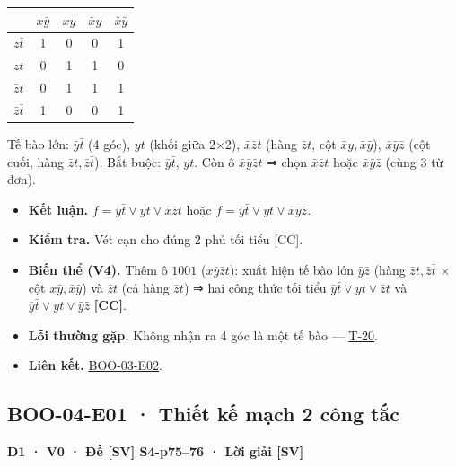 \documentclass[
  10pt,
  twoside,openany]{book}
\providecommand{\tightlist}{%
  \setlength{\itemsep}{0pt}\setlength{\parskip}{0pt}}
\begin{document}
\begin{longtable}[]{@{}lcccc@{}}
\toprule\noalign{}
& \(x\bar y\) & \(xy\) & \(\bar xy\) & \(\bar x\bar y\) \\
\midrule\noalign{}
\endhead
\bottomrule\noalign{}
\endlastfoot
\(z\bar t\) & 1 & 0 & 0 & 1 \\
\(zt\) & 0 & 1 & 1 & 0 \\
\(\bar zt\) & 0 & 1 & 1 & 1 \\
\(\bar z\bar t\) & 1 & 0 & 0 & 1 \\
\end{longtable}

Tế bào lớn: \(\bar y\bar t\) (4 góc), \(yt\) (khối giữa 2×2),
\(\bar x\bar zt\) (hàng \(\bar zt\), cột \(\bar xy,\bar x\bar y\)),
\(\bar x\bar y\bar z\) (cột cuối, hàng \(\bar zt,\bar z\bar t\)). Bắt
buộc: \(\bar y\bar t\), \(yt\). Còn ô \(\bar x\bar y\bar zt\) ⇒ chọn
\(\bar x\bar zt\) hoặc \(\bar x\bar y\bar z\) (cùng 3 từ đơn).

\begin{itemize}
\tightlist
\item
  \textbf{Kết luận.} \(f=\bar y\bar t\vee yt\vee\bar x\bar zt\) hoặc
  \(f=\bar y\bar t\vee yt\vee\bar x\bar y\bar z\).
\item
  \textbf{Kiểm tra.} Vét cạn cho đúng 2 phủ tối tiểu {[}CC{]}.
\item
  \textbf{Biến thể (V4).} Thêm ô \(1001\) (\(x\bar y\bar zt\)): xuất
  hiện tế bào lớn \(\bar y\bar z\) (hàng \(\bar zt,\bar z\bar t\) × cột
  \(x\bar y,\bar x\bar y\)) và \(\bar zt\) (cả hàng \(\bar zt\)) ⇒ hai
  công thức tối tiểu \(\bar y\bar t\vee yt\vee\bar zt\) và
  \(\bar y\bar t\vee yt\vee\bar y\bar z\) \textbf{{[}CC{]}}.
\item
  \textbf{Lỗi thường gặp.} Không nhận ra 4 góc là một tế bào ---
  \protect\hyperlink{T-20}{T-20}.
\item
  \textbf{Liên kết.} \protect\hyperlink{BOO-03-E02}{BOO-03-E02}.
\end{itemize}

\hypertarget{BOO-04-E01}{%
\subsection{BOO-04-E01 · Thiết kế mạch 2 công tắc}\label{BOO-04-E01}}

\textbf{D1 · V0 · Đề {[}SV{]} S4-p75--76 · Lời giải {[}SV{]}}
\end{document}

